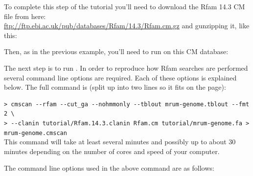To complete this step of the tutorial you'll need to download the Rfam
14.3 CM file from here: \\
\url{ftp://ftp.ebi.ac.uk/pub/databases/Rfam/14.3/Rfam.cm.gz} 
and gunzipping it, like this: 



Then, as in the previous example, you'll need to run  on
this CM database:


The next step is to run . In order to reproduce how Rfam
searches are performed \citep{Nawrocki15} several command line
options are required. Each of these options is explained below. The
full command is (split up into two lines so it fits on the page): 

\indent\indent\small\verb+> cmscan --rfam --cut_ga --nohmmonly --tblout mrum-genome.tblout --fmt 2 \+\\
\indent\indent\small\verb+> --clanin tutorial/Rfam.14.3.clanin Rfam.cm tutorial/mrum-genome.fa > mrum-genome.cmscan+\\

This command will take at least several minutes and possibly up to
about 30 minutes depending on the number of cores and speed of your
computer. 

The command line options used in the above command are as follows:

